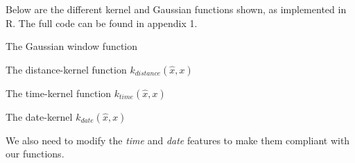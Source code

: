 \documentclass[a4paper, 12pt]{article}
\begin{document}
    Below are the different kernel and Gaussian functions shown, as implemented in R.  The full code can be found in appendix 1.

    The Gaussian window function
    
    
    The distance-kernel function \(k_{distance}(\hat{x}, x)\)
    

    The time-kernel function \(k_{time}(\hat{x}, x)\)
    

    The date-kernel \(k_{date}(\hat{x}, x)\)
    
    
    We also need to modify the \textit{time} and \textit{date} features to make them compliant with our functions.
    
\end{document}

